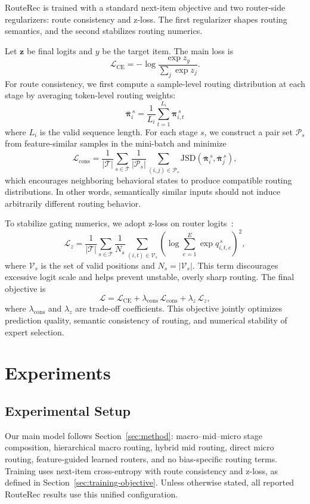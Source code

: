 \documentclass[sigconf,anonymous,review]{acmart-primary/acmart}
\begin{document}
RouteRec is trained with a standard next-item objective and two router-side regularizers: route consistency and z-loss. The first regularizer shapes routing semantics, and the second stabilizes routing numerics.

Let $\mathbf{z}$ be final logits and $y$ be the target item. The main loss is
\[
\mathcal{L}_{\mathrm{CE}}
=
-\log \frac{\exp z_y}{\sum_{j}\exp z_j}.
\]
For route consistency, we first compute a sample-level routing distribution at each stage by averaging token-level routing weights:
\[
\bar{\boldsymbol{\pi}}_i^{\,s}
=
\frac{1}{L_i}\sum_{t=1}^{L_i}\boldsymbol{\pi}_{i,t}^{\,s}
\]
where $L_i$ is the valid sequence length. For each stage $s$, we construct a pair set $\mathcal{P}_s$ from feature-similar samples in the mini-batch and minimize
\[
\mathcal{L}_{\mathrm{cons}}
=
\frac{1}{|\mathcal{T}|}
\sum_{s \in \mathcal{T}}
\frac{1}{|\mathcal{P}_s|}
\sum_{(i,j)\in \mathcal{P}_s}
\mathrm{JSD}\!\left(\bar{\boldsymbol{\pi}}_i^{\,s}, \bar{\boldsymbol{\pi}}_j^{\,s}\right),
\]
which encourages neighboring behavioral states to produce compatible routing distributions. In other words, semantically similar inputs should not induce arbitrarily different routing behavior.

To stabilize gating numerics, we adopt z-loss on router logits~\cite{zoph2022stmoe}:
\[
\mathcal{L}_{z}
=
\frac{1}{|\mathcal{T}|}
\sum_{s \in \mathcal{T}}
\frac{1}{N_s}
\sum_{(i,t)\in\mathcal{V}_s}
\left(
\log \sum_{e=1}^{E}\exp q_{i,t,e}^{\,s}
\right)^2,
\]
where $\mathcal{V}_s$ is the set of valid positions and $N_s=|\mathcal{V}_s|$. This term discourages excessive logit scale and helps prevent unstable, overly sharp routing. The final objective is
\[
\mathcal{L}
=
\mathcal{L}_{\mathrm{CE}}
+
\lambda_{\mathrm{cons}}\,\mathcal{L}_{\mathrm{cons}}
+
\lambda_{z}\,\mathcal{L}_{z},
\]
where $\lambda_{\mathrm{cons}}$ and $\lambda_z$ are trade-off coefficients. This objective jointly optimizes prediction quality, semantic consistency of routing, and numerical stability of expert selection.


\section{Experiments}
\label{sec:experiments}

\subsection{Experimental Setup}
Our main model follows Section~\ref{sec:method}: macro--mid--micro stage composition, hierarchical macro routing, hybrid mid routing, direct micro routing, feature-guided learned routers, and no bias-specific routing terms. Training uses next-item cross-entropy with route consistency and z-loss, as defined in Section~\ref{sec:training-objective}. Unless otherwise stated, all reported RouteRec results use this unified configuration.
\end{document}
